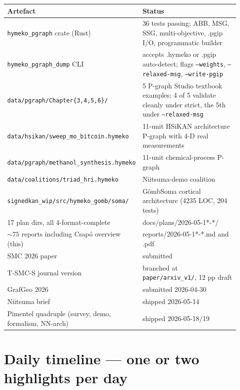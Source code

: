 \documentclass[11pt,a4paper]{article}
\theoremstyle{plain}
\theoremstyle{definition}
\newcommand{\code}[1]{\texttt{\small #1}}
\begin{document}
\begin{center}\footnotesize
\begin{tabular}{p{0.40\linewidth} p{0.55\linewidth}}
\toprule
Artefact & Status \\
\midrule
\code{hymeko\_pgraph} crate (Rust) & 36 tests passing; ABB, MSG, SSG, multi-objective, .pgip I/O, programmatic builder \\
\code{hymeko\_pgraph\_dump} CLI & accepts .hymeko or .pgip auto-detect; flags \code{--weights}, \code{--relaxed-msg}, \code{--write-pgip} \\
\code{data/pgraph/Chapter\{3,4,5,6\}/} & 5 P-graph Studio textbook examples; 4 of 5 validate cleanly under strict, the 5th under \code{--relaxed-msg} \\
\code{data/hsikan/sweep\_mo\_bitcoin.hymeko} & 11-unit HSiKAN architecture P-graph with 4-D real measurements \\
\code{data/pgraph/methanol\_synthesis.hymeko} & 11-unit chemical-process P-graph \\
\code{data/coalitions/triad\_hri.hymeko} & Niitsuma-demo coalition \\
\code{signedkan\_wip/src/hymeko\_gomb/soma/} & GömbSoma cortical architecture (4235 LOC, 204 tests) \\
17 plan dirs, all 4-format-complete & docs/plans/2026-05-1*-*/ \\
${\sim}75$ reports including Csap\'o overview (this) & reports/2026-05-1*-*.md and .pdf \\
SMC 2026 paper                                              & submitted \\
T-SMC-S journal version                                     & branched at \code{paper/arxiv\_v1/}, 12 pp draft \\
GrafGeo 2026                                                & submitted 2026-04-30 \\
Niitsuma brief                                              & shipped 2026-05-14 \\
Pimentel quadruple (survey, demo, formalism, NN-arch)        & shipped 2026-05-18/19 \\
\bottomrule
\end{tabular}
\end{center}

\section{Daily timeline — one or two highlights per day}
\end{document}
